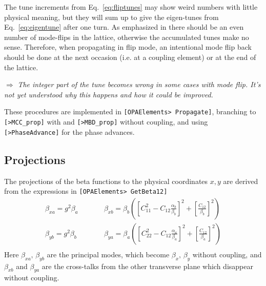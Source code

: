 \documentclass[12pt]{article}
\newcommand\todo[1]{$\Longrightarrow$ {\em #1} }
\newcommand\code[1]{{\tt [#1]}}
\begin{document}
The tune increments from Eq.~\ref{eq:fliptunes} may show weird numbers with little physical meaning, but they will sum up to give the eigen-tunes from Eq.~\ref{eq:eigentune} after one turn.
As emphasized in \cite{SAGAN} there should be an even number of mode-flips in the lattice, otherwise the accumulated tunes make no sense.
Therefore, when propagating in flip mode, an intentional mode flip back should be done at the next occasion (i.e. at a coupling element) or at the end of the lattice.

\todo{The integer part of the tune becomes wrong in some cases with mode flip. It's not yet understood why this happens and how it could be improved.}

These procedures are implemented in \code{OPAElements> Propagate}, branching to \code{>MCC\_prop} with and  \code{>MBD\_prop} without coupling, and using \code{>PhaseAdvance} for the phase advances.


\subsection{Projections}
The projections of the beta functions to the physical coordinates $x,y$ are derived from the expressions in \cite{SAGAN} \code{OPAElements> GetBeta12}
\begin{eqnarray}
\beta_{xa}=g^2 \beta_a & \qquad &
\beta_{xb} = \beta_b \left( \left[ C_{11}^2-C_{12}\frac{\alpha_b}{\beta_b} \right]^2 + \left[ \frac{C_{12}}{\beta_b}\right]^2\right) \\
\beta_{yb}=g^2 \beta_b & \qquad &
\beta_{ya} = \beta_a \left( \left[ C_{22}^2-C_{12}\frac{\alpha_a}{\beta_a} \right]^2 + \left[ \frac{C_{12}}{\beta_a}\right]^2\right) \\
\end{eqnarray}
Here $\beta_{xa},\, \beta_{yb}$ are the principal modes, which become $\beta_x,\, \beta_y$ without coupling, and $\beta_{xb}$ and $\beta_{ya}$ are the cross-talks from the other transverse plane which disappear without coupling.\\
\end{document}
